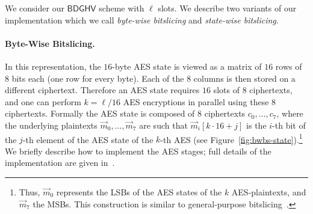 \documentclass[11pt]{llncs}
\newcommand*{\BDGHV}{\ensuremath{\mathsf{BDGHV}}}
\newcommand*\bwbs{byte-wise bitslicing\xspace}
\newcommand*\swbs{state-wise bitslicing\xspace}
\begin{document}
We consider our $\BDGHV$ scheme with $\ell$ slots. We describe two
variants of our implementation which we call \emph{\bwbs} and
\emph{\swbs}.

\paragraph{Byte-Wise Bitslicing.} In this representation, the
$16$-byte AES state is viewed as a matrix of $16$ rows of $8$ bits
each (one row for every byte). Each of the $8$ columns is then stored on a different
ciphertext. Therefore an AES state requires $16$ slots of $8$
ciphertexts, and one can perform
$k=\ell/16$ AES encryptions in parallel using these $8$
ciphertexts. Formally the AES state is composed of $8$ ciphertexts $c_0,\ldots,c_7$, where
the underlying plaintexts $\vec m_0,\ldots,\vec m_7$ are such that
$\vec m_i[k\cdot 16+j]$ is the $i$-th bit of the $j$-th element of the AES
state of the $k$-th AES (see Figure~\ref{fig:bwbs-state}).\footnote{
Thus, $\vec m_0$ represents the LSBs
  of the AES states of the $k$ AES-plaintexts, and $\vec m_7$ the
  MSBs. This construction is similar to general-purpose
  bitslicing~\cite{Bih1997,KS2009}.} We briefly
describe how to implement the AES stages; full details 
of the implementation are given in~\cite{CLT2013a}. 
\end{document}
